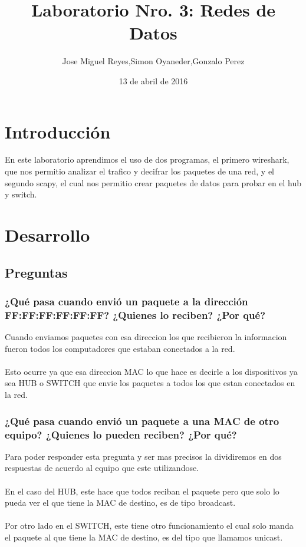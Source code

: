 \documentclass[spanish]{udpreport}
\title{Laboratorio Nro. 3: Redes de Datos}
\author{Jose Miguel Reyes,Simon Oyaneder,Gonzalo Perez}
\date{13 de abril de 2016}
\begin{document}
\maketitle

\tableofcontents

\chapter{Introducción}
En este laboratorio aprendimos el uso de dos programas, el primero wireshark, que nos permitio analizar el trafico y decifrar los paquetes de una red, y el segundo scapy, el cual nos permitio crear paquetes de datos para probar en el hub y switch. 
\chapter{Desarrollo}
\section{Preguntas}

\subsection{¿Qué pasa cuando envió un paquete a la dirección FF:FF:FF:FF:FF:FF? ¿Quienes
lo reciben? ¿Por qué?}

Cuando enviamos paquetes con esa direccion los que recibieron la informacion fueron todos los computadores que estaban conectados a la red.\\\\
Esto ocurre ya que esa direccion MAC lo que hace es decirle a los dispositivos ya sea HUB o SWITCH que envie los paquetes a todos los que estan conectados en la red.

\subsection{¿Qué pasa cuando envió un paquete a una MAC de otro equipo? ¿Quienes lo
pueden reciben? ¿Por qué?}

Para poder responder esta pregunta y ser mas precisos la dividiremos en dos respuestas de acuerdo al equipo que este utilizandose.\\\\
En el caso del HUB, este hace que todos reciban el paquete pero que solo lo pueda ver el que tiene la MAC de destino, es de tipo broadcast.\\\\
Por otro lado en el SWITCH, este tiene otro funcionamiento el cual solo manda el paquete al que tiene la MAC de destino, es del tipo que llamamos unicast.
\end{document}
